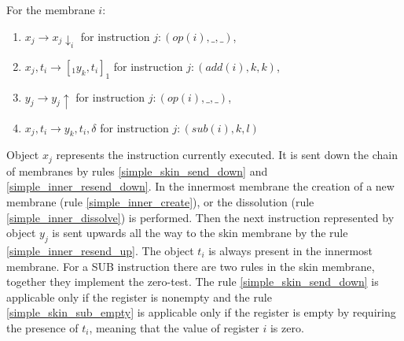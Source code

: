 \begin{dokaz}
      For the membrane $i$:
      \begin{enumerate}[resume]
        \item\label{simple_inner_resend_down} $x_j \rightarrow x_j\downarrow_{i}$ for instruction $j: (op(i), \_, \_)$,
        \item\label{simple_inner_create} $x_j, t_i \rightarrow [_1 y_k, t_i ]_1$ for instruction $j: (add(i), k, k)$,
        \item\label{simple_inner_resend_up} $y_j \rightarrow y_j\uparrow$ for instruction $j: (op(i), \_, \_)$,
        \item\label{simple_inner_dissolve} $x_j, t_i \rightarrow y_k, t_i, \delta$ for instruction $j: (sub(i), k, l)$
      \end{enumerate}

      Object $x_j$ represents the instruction currently executed. It is sent down the chain of membranes by rules \ref{simple_skin_send_down} and \ref{simple_inner_resend_down}. In the innermost membrane the creation of a new membrane (rule \ref{simple_inner_create}), or the dissolution (rule \ref{simple_inner_dissolve}) is performed. Then the next instruction represented by object $y_j$ is sent upwards all the way to the skin membrane by the rule \ref{simple_inner_resend_up}. The object $t_i$ is always present in the innermost membrane. For a SUB instruction there are two rules in the skin membrane, together they implement the zero-test. The rule \ref{simple_skin_send_down} is applicable only if the register is nonempty and the rule \ref{simple_skin_sub_empty} is applicable only if the register is empty by requiring the presence of $t_i$, meaning that the value of register $i$ is zero.
    \end{dokaz}


